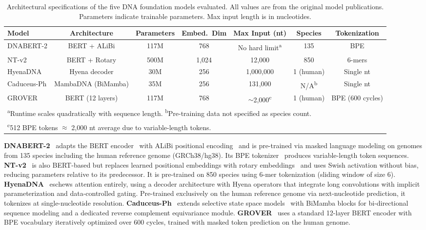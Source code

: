\documentclass[11pt]{article}
\begin{document}
\begin{table}[htbp]
\centering
\caption{Architectural specifications of the five DNA foundation models evaluated. All values are from the original model publications. Parameters indicate trainable parameters. Max input length is in nucleotides.}
\label{tab:model_specs}
\begin{adjustbox}{max width=\textwidth}
\begin{tabular}{lcccccc}
\toprule
\textbf{Model} & \textbf{Architecture} & \textbf{Parameters} & \textbf{Embed.\ Dim} & \textbf{Max Input (nt)} & \textbf{Species} & \textbf{Tokenization} \\
\midrule
DNABERT-2 & BERT + ALiBi & 117M & 768 & No hard limit\textsuperscript{a} & 135 & BPE \\
NT-v2 & BERT + Rotary & 500M & 1,024 & 12,000 & 850 & 6-mers \\
HyenaDNA & Hyena decoder & 30M & 256 & 1,000,000 & 1 (human) & Single nt \\
Caduceus-Ph & MambaDNA (BiMamba) & 35M & 256 & 131,000 & N/A\textsuperscript{b} & Single nt \\
GROVER & BERT (12 layers) & 117M & 768 & $\sim$2,000\textsuperscript{c} & 1 (human) & BPE (600 cycles) \\
\bottomrule
\multicolumn{7}{l}{\footnotesize \textsuperscript{a}Runtime scales quadratically with sequence length. \textsuperscript{b}Pre-training data not specified as species count.} \\
\multicolumn{7}{l}{\footnotesize \textsuperscript{c}512 BPE tokens $\approx$ 2,000 nt average due to variable-length tokens.} \\
\end{tabular}
\end{adjustbox}
\end{table}

\textbf{DNABERT-2}~\citep{zhou2024dnabert2} adapts the BERT encoder~\citep{devlin2019bert} with ALiBi positional encoding~\citep{press2022alibi} and is pre-trained via masked language modeling on genomes from 135 species including the human reference genome (GRCh38/hg38). Its BPE tokenizer~\citep{sennrich2016bpe} produces variable-length token sequences. \textbf{NT-v2}~\citep{dallatorre2023nucleotide} is also BERT-based but replaces learned positional embeddings with rotary embeddings~\citep{su2024roformer} and uses Swish activation without bias, reducing parameters relative to its predecessor. It is pre-trained on 850 species using 6-mer tokenization (sliding window of size 6). \textbf{HyenaDNA}~\citep{nguyen2024hyenadna} eschews attention entirely, using a decoder architecture with Hyena operators that integrate long convolutions with implicit parameterization and data-controlled gating. Pre-trained exclusively on the human reference genome via next-nucleotide prediction, it tokenizes at single-nucleotide resolution. \textbf{Caduceus-Ph}~\citep{schiff2024caduceus} extends selective state space models~\citep{gu2024mamba} with BiMamba blocks for bi-directional sequence modeling and a dedicated reverse complement equivariance module. \textbf{GROVER}~\citep{sanabria2024grover} uses a standard 12-layer BERT encoder with BPE vocabulary iteratively optimized over 600 cycles, trained with masked token prediction on the human genome.
\end{document}
